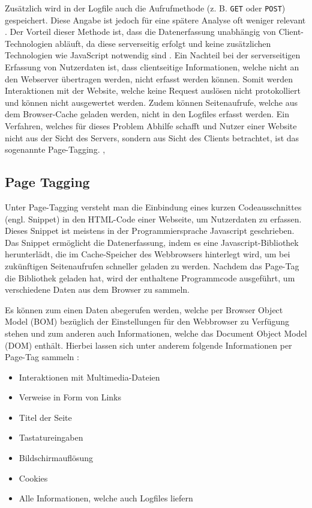 Zusätzlich wird in der Logfile auch die Aufrufmethode (z. B. \texttt{GET} oder \texttt{POST}) gespeichert. Diese Angabe ist jedoch für eine spätere Analyse oft weniger relevant \parencite[Kap.2.2]{Hassler2019}. Der Vorteil dieser Methode ist, dass die Datenerfassung unabhängig von Client-Technologien abläuft, da diese serverseitig erfolgt und keine zusätzlichen Technologien wie JavaScript notwendig sind \parencite{RyteLogFiles}. Ein Nachteil bei der serverseitigen Erfassung von Nutzerdaten ist, dass clientseitige Informationen, welche nicht an den Webserver übertragen werden, nicht erfasst werden können. Somit werden Interaktionen mit der Website, welche keine Request auslösen nicht protokolliert und können nicht ausgewertet werden. Zudem können Seitenaufrufe, welche aus dem Browser-Cache geladen werden, nicht in den Logfiles erfasst werden. Ein Verfahren, welches für dieses Problem Abhilfe schafft und Nutzer einer Website nicht aus der Sicht des Servers, sondern aus Sicht des Clients betrachtet, ist das sogenannte Page-Tagging. \parencite{CounterCodePageTagging}, \parencite{CounterCodeLogFiles}

\subsection{Page Tagging}
\label{sec:pagetagging}
Unter Page-Tagging versteht man die Einbindung eines kurzen Codeausschnittes (engl. Snippet) in den HTML-Code einer Webseite, um Nutzerdaten zu erfassen. Dieses Snippet ist meistens in der Programmiersprache Javascript geschrieben. Das Snippet ermöglicht die Datenerfassung, indem es eine Javascript-Bibliothek herunterlädt, die im Cache-Speicher des Webbrowsers hinterlegt wird, um bei zukünftigen Seitenaufrufen schneller geladen zu werden. Nachdem das Page-Tag die Bibliothek geladen hat, wird der enthaltene Programmcode ausgeführt, um verschiedene Daten aus dem Browser zu sammeln. \parencite[S.70-71]{Dykes2014}

Es können zum einen Daten abegerufen werden, welche per Browser Object Model (BOM) bezüglich der Einstellungen für den Webbrowser zu Verfügung stehen und zum anderen auch Informationen, welche das Document Object Model (DOM) enthält. Hierbei lassen sich unter anderem folgende Informationen per Page-Tag sammeln \parencite[Kap.2.3]{Hassler2019}:

\begin{itemize}
    \item Interaktionen mit Multimedia-Dateien
    \item Verweise in Form von Links
    \item Titel der Seite
    \item Tastatureingaben
    \item Bildschirmauflösung
    \item Cookies
    \item Alle Informationen, welche auch Logfiles liefern
\end{itemize}

